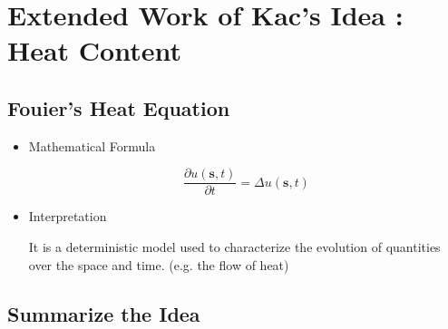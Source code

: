\section{Extended Work of Kac’s Idea \cite{desjardins1994heat}\cite{vandenberg1994heat}: Heat Content}


\subsection{Fouier's Heat Equation \cite{baron1878analytical}}

  \begin{itemize}
    \item Mathematical Formula
        \par
        \begin{equation}\label{eq:heat_equation}
          \frac{\partial u(\bm{s}, t)}{\partial t} = \Delta u(\bm{s}, t)
        \end{equation}

   \item Interpretation
     \par
     It is a deterministic model used to characterize the evolution of quantities over the space and time. (e.g. the flow of heat)
  \end{itemize}




\subsection{Summarize the Idea}

